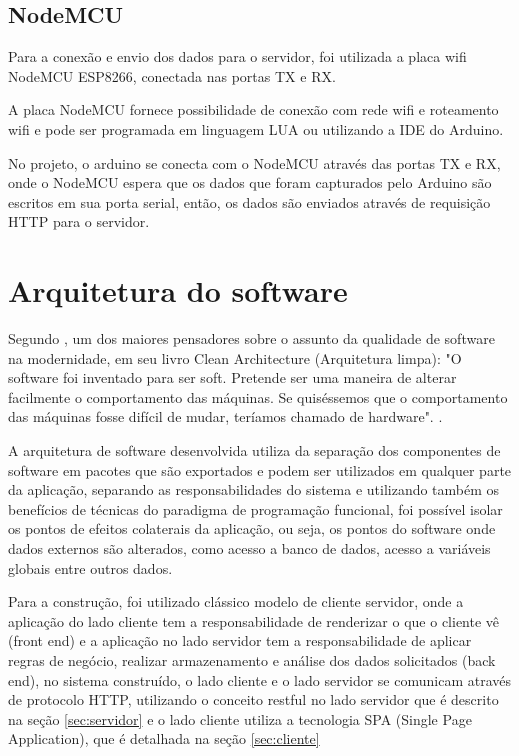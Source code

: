 \section{NodeMCU}
\label{sec:nodemcu}

Para a conexão e envio dos dados para o servidor, foi utilizada a placa wifi NodeMCU ESP8266, conectada nas portas TX e RX.

A placa NodeMCU fornece possibilidade de conexão com rede wifi e roteamento wifi e pode ser programada em linguagem LUA ou utilizando a IDE do Arduino.

No projeto, o arduino se conecta com o NodeMCU através das portas TX e RX, onde o NodeMCU espera que os dados que foram capturados pelo Arduino são escritos em sua porta serial, então, os dados são enviados através de requisição HTTP para o servidor.

\chapter{Arquitetura do software}
\label{sec:arquitetura_software}

Segundo , um dos maiores pensadores sobre o assunto da qualidade de software na modernidade, em seu livro Clean Architecture (Arquitetura limpa): "O software foi inventado para ser soft. Pretende ser uma maneira de alterar facilmente o comportamento das máquinas. Se quiséssemos que o comportamento das máquinas fosse difícil de mudar, teríamos chamado de hardware". \cite{clean_architecture}.

A arquitetura de software desenvolvida utiliza da separação dos componentes de software em pacotes que são exportados e podem ser utilizados em qualquer parte da aplicação, separando as responsabilidades do sistema e utilizando também os benefícios de técnicas do paradigma de programação funcional, foi possível isolar os pontos de efeitos colaterais da aplicação, ou seja, os pontos do software onde dados externos são alterados, como acesso a banco de dados, acesso a variáveis globais entre outros dados.

Para a construção, foi utilizado clássico modelo de cliente servidor, onde a aplicação do lado cliente tem a responsabilidade de renderizar o que o cliente vê (front end) e a aplicação no lado servidor tem a responsabilidade de aplicar regras de negócio, realizar armazenamento e análise dos dados solicitados (back end), no sistema construído, o lado cliente e o lado servidor se comunicam através de protocolo HTTP, utilizando o conceito restful no lado servidor que é descrito na seção \ref{sec:servidor} e o lado cliente utiliza a tecnologia SPA (Single Page Application), que é detalhada na seção \ref{sec:cliente}

